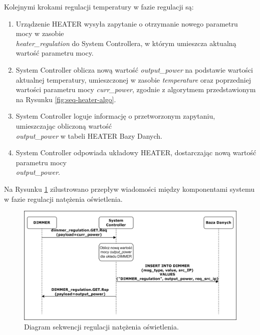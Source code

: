             Kolejnymi krokami regulacji temperatury w fazie regulacji są:
            \begin{enumerate}
                \item Urządzenie HEATER wysyła zapytanie o otrzymanie nowego parametru mocy w zasobie \\ \textit{heater\_regulation} do System Controllera, w którym umieszcza aktualną wartość parametru mocy.
                \item System Controller oblicza nową wartość \textit{output\_power} na podstawie wartości aktualnej temperatury, umieszczonej w zasobie \textit{temperature} oraz poprzedniej wartości parametru mocy \textit{curr\_power}, zgodnie z algorytmem przedstawionym na Rysunku \ref{fig:seq-heater-algo}.
                \item System Controller loguje informację o przetworzonym zapytaniu, umieszczając obliczoną wartość \\ \textit{output\_power} w tabeli HEATER Bazy Danych.
                \item System Controller odpowiada układowy HEATER, dostarczając nową wartość parametru mocy \\ \textit{output\_power}.
            \end{enumerate}

            Na Rysunku \ref{fig:seq-dimmer-regulate} zilustrowano przepływ wiadomości między komponentami systemu w fazie regulacji natężenia oświetlenia.

            \begin{figure}[H]
                \centering
                \includegraphics[width=0.8\linewidth]{graphics/sequence-diagrams/dimmer-regulate-seq.png}
                \caption{Diagram sekwencji regulacji natężenia oświetlenia.}
                \label{fig:seq-dimmer-regulate}
            \end{figure}

